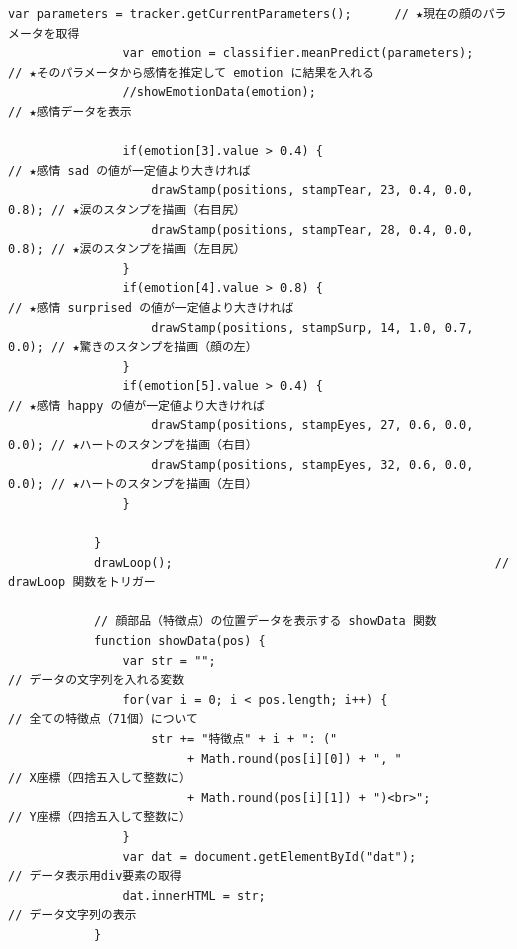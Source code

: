 \documentclass[mingoth,11pt,a4j,uplatex]{jsarticle}
\begin{document}
\begin{lstlisting}[caption=.07-06html]
                var parameters = tracker.getCurrentParameters();      // ★現在の顔のパラメータを取得
                var emotion = classifier.meanPredict(parameters);     // ★そのパラメータから感情を推定して emotion に結果を入れる
                //showEmotionData(emotion);                             // ★感情データを表示

                if(emotion[3].value > 0.4) {                          // ★感情 sad の値が一定値より大きければ
                    drawStamp(positions, stampTear, 23, 0.4, 0.0, 0.8); // ★涙のスタンプを描画（右目尻）
                    drawStamp(positions, stampTear, 28, 0.4, 0.0, 0.8); // ★涙のスタンプを描画（左目尻）
                }
                if(emotion[4].value > 0.8) {                          // ★感情 surprised の値が一定値より大きければ
                    drawStamp(positions, stampSurp, 14, 1.0, 0.7, 0.0); // ★驚きのスタンプを描画（顔の左）
                }
                if(emotion[5].value > 0.4) {                          // ★感情 happy の値が一定値より大きければ
                    drawStamp(positions, stampEyes, 27, 0.6, 0.0, 0.0); // ★ハートのスタンプを描画（右目）
                    drawStamp(positions, stampEyes, 32, 0.6, 0.0, 0.0); // ★ハートのスタンプを描画（左目）
                }
                
            }
            drawLoop();                                             // drawLoop 関数をトリガー
            
            // 顔部品（特徴点）の位置データを表示する showData 関数
            function showData(pos) {
                var str = "";                                         // データの文字列を入れる変数
                for(var i = 0; i < pos.length; i++) {                 // 全ての特徴点（71個）について
                    str += "特徴点" + i + ": ("
                         + Math.round(pos[i][0]) + ", "                 // X座標（四捨五入して整数に）
                         + Math.round(pos[i][1]) + ")<br>";             // Y座標（四捨五入して整数に）
                }
                var dat = document.getElementById("dat");             // データ表示用div要素の取得
                dat.innerHTML = str;                                  // データ文字列の表示
            }


\end{lstlisting}
\end{document}
